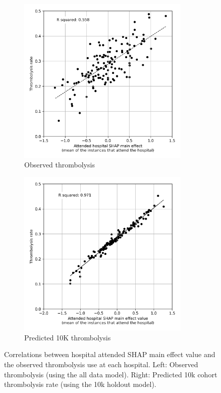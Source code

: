 \begin{figure}[!h]
\centering
\begin{subfigure}{.49\textwidth}
  \centering
    \caption*{\footnotesize{\textsf{Observed thrombolysis}}}
    \includegraphics[width=0.9\textwidth]{./images/03c_xgb_10_features_attended_hosp_shap_maineffect_vs_ivt_rate}
\end{subfigure}
\begin{subfigure}{.49\textwidth}
  \centering
    \caption*{\footnotesize{\textsf{Predicted 10K thrombolysis}}}
    \includegraphics[width=0.9\textwidth]{./images/04a_xgb_10_features_10k_cohort_attended_hosp_shap_maineffect_vs_ivt_rate}
\end{subfigure}

\caption{Correlations between hospital attended SHAP main effect value and the observed thrombolysis use at each hospital. Left: Observed thrombolysis (using the all data model). Right: Predicted 10k cohort thrombolysis rate (using the 10k holdout model).}
\label{fig:shap_correlation}
\end{figure}


